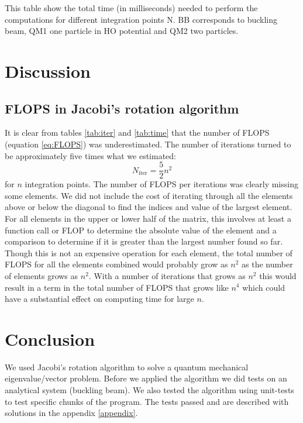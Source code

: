 \documentclass[reprint,english,notitlepage,nofootinbib]{revtex4-1}  %
\begin{document}
\begin{table}[h]
	
	\label{tab:time}
	\caption{This table show the total time (in milliseconds) needed to perform the computations for different integration points N. BB corresponds to buckling beam, QM1 one particle in HO potential and QM2 two particles.}
\end{table}

\section{Discussion}

\subsection{FLOPS in Jacobi's rotation algorithm}

It is clear from tables \ref{tab:iter} and \ref{tab:time} that the number of FLOPS (equation \ref{eq:FLOPS}) was underestimated. The number of iterations turned to be approximately five times what we estimated:
\begin{equation*}
  N_{\text{iter}} = \frac{5}{2}n^2
\end{equation*}
for $n$ integration points. The number of FLOPS per iterations was clearly missing some elements. We did not include the cost of iterating through all the elements above or below the diagonal to find the indices and value of the largest element. For all elements in the upper or lower half of the matrix, this involves at least a function call or FLOP to determine the absolute value of the element and a comparison to determine if it is greater than the largest number found so far. Though this is not an expensive operation for each element, the total number of FLOPS for all the elements combined would probably grow as $n^2$ as the number of elements grows as $n^2$. With a number of iterations that grows as $n^2$ this would result in a term in the total number of FLOPS that grows like $n^4$ which could have a substantial effect on computing time for large $n$.



\section{Conclusion}

We used Jacobi's rotation algorithm to solve a quantum mechanical eigenvalue/vector problem. Before we applied the algorithm we did tests on an analytical system (buckling beam). We also tested the algorithm using unit-tests to test specific chunks of the program. The tests passed and are described with solutions in the appendix \ref{appendix}.
\end{document}
